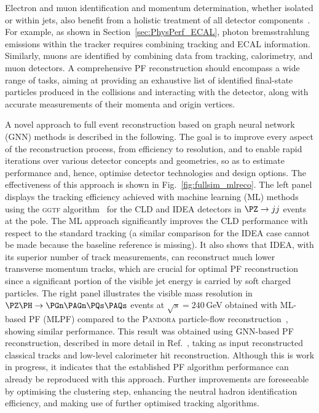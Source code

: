 Electron and muon identification and momentum determination, whether isolated or within jets, also benefit from a holistic treatment of all detector components~\cite{ALEPH:1994ayc,CMS:2017yfk}. 
For example, as shown in Section~\ref{sec:PhysPerf_ECAL}, photon bremsstrahlung emissions within the tracker requires combining tracking and ECAL information. 
Similarly, muons are identified by combining data from tracking, calorimetry, and muon detectors. A
comprehensive PF reconstruction should encompass a wide range of tasks, 
aiming at providing an exhaustive list of identified final-state particles produced in the collisions and interacting with the detector, 
along with accurate measurements of their momenta and origin vertices.

A novel approach to full event reconstruction based on graph neural network (GNN) methods is described in the following. 
The goal is to improve every aspect of the reconstruction process, from efficiency to resolution, 
and to enable rapid iterations over various detector concepts and geometries, so as to estimate performance and, hence, optimise detector technologies and design options. 
The effectiveness of this approach is shown in Fig.~\ref{fig:fullsim_mlreco}. 
The left panel displays the tracking efficiency achieved with machine learning (ML) methods using the \textsc{ggtf} algorithm~\cite{MLTRACKING_NOTE} 
for the CLD and IDEA detectors in $\PZ \to jj$ events at the \PZ pole. 
The ML approach significantly improves the CLD performance with respect to the standard tracking 
(a similar comparison for the IDEA case cannot be made because the baseline reference is missing). 
It also shows that IDEA, with its superior number of track measurements, can reconstruct much lower transverse momentum tracks, 
which are crucial for optimal PF reconstruction since a significant portion of the visible jet energy is carried by soft charged particles. 
The right panel illustrates the visible mass resolution in $\PZ\PH \to \PGn \PAGn \PQs \PAQs$ events at $\sqrt{s} = 240$\,GeV 
obtained with ML-based PF (MLPF) compared to the \textsc{Pandora} particle-flow reconstruction~\cite{pandorapfa,pandorasdk}, showing similar performance. 
This result was obtained using GNN-based PF reconstruction, described in more detail in Ref.~\cite{MLPF_NOTE}, 
taking as input reconstructed classical tracks and low-level calorimeter hit reconstruction. 
Although this is work in progress, it indicates that the established PF algorithm performance can already be reproduced with this approach. 
Further improvements are foreseeable by optimising the clustering step, 
enhancing the neutral hadron identification efficiency, and making use of further optimised tracking algorithms.

